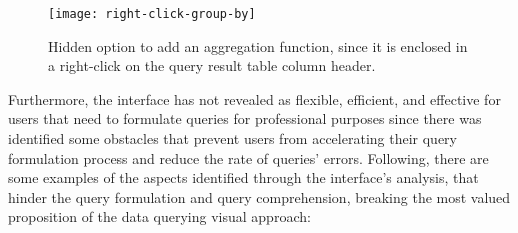 \begin{figure}[htbp]
	\centering
	\texttt{[image: right-click-group-by]}
	\caption{Hidden option to add an aggregation function, since it is enclosed in a right-click on the query result table column header.}
	\label{fig:rightClickGroupBy}
\end{figure}

Furthermore, the interface has not revealed as flexible, efficient, and effective for users that need to formulate queries for professional purposes since there was identified some obstacles that prevent users from accelerating their query formulation process and reduce the rate of queries' errors. Following, there are some examples of the aspects identified through the interface's analysis, that hinder the query formulation and query comprehension, breaking the most valued proposition of the data querying visual approach:

